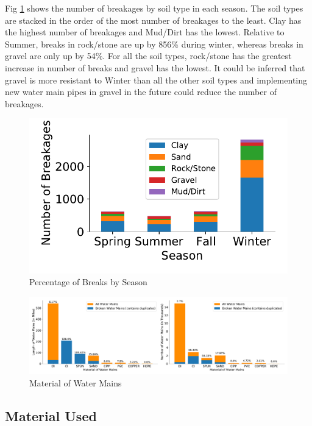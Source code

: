\documentclass[twocolumn]{article}
\begin{document}
Fig \ref{fig:Soil Type and Season} shows the number of breakages by soil type in each season. The soil types are stacked in the order of the most number of breakages to the least. Clay has the highest number of breakages and Mud/Dirt has the lowest. Relative to Summer, breaks in rock/stone are up by 856\% during winter, whereas breaks in gravel are only up by 54\%. For all the soil types, rock/stone has the greatest increase in number of breaks and gravel has the lowest. It could be inferred that gravel is more resistant to Winter than all the other soil types and implementing new water main pipes in gravel in the future could reduce the number of breakages.

\begin{figure}[H]
    \includegraphics[width=\columnwidth]{Wen/Soil Type by Season.pdf}
    \caption{Percentage of Breaks by Season}
    \label{fig:Soil Type and Season}
\end{figure}


\begin{figure}
    \includegraphics[width=\textwidth]{Wen/Material by len and count.pdf}
    \caption{Material of Water Mains}
    \label{fig:Material of Water Mains}
\end{figure}
\subsection{Material Used}
\end{document}
